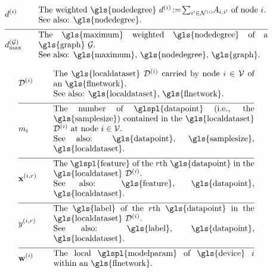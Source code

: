 \begin{align}
	&\nodedegree{\nodeidx} & \quad & \parbox{.80\textwidth}{The weighted \gls{nodedegree} 
		$\nodedegree{\nodeidx}\!\defeq\!\sum_{\nodeidx' \in \neighbourhood{\nodeidx}}\hspace*{-1mm} \edgeweight_{\nodeidx,\nodeidx'}$ of node $\nodeidx$. 
		\\ See also: \gls{nodedegree}. }  \nonumber \\[2mm] \hline \nonumber\\[-5mm]
	&\maxnodedegree^{(\graph)} & \quad & \parbox{.80\textwidth}{The \gls{maximum} weighted \gls{nodedegree} of a \gls{graph} $\graph$.
		\\ See also: \gls{maximum}, \gls{nodedegree}, \gls{graph}. } \nonumber 
\end{align} 

\begin{align} 
	&\localdataset{\nodeidx} & \quad & \parbox{.70\textwidth}{The \gls{localdataset} $\localdataset{\nodeidx}$ carried by 
		node $\nodeidx\in \nodes$ of an \gls{flnetwork}.
		\\ See also: \gls{localdataset}, \gls{flnetwork}. } \nonumber \\[2mm] \hline \nonumber\\[-5mm] 
	&\localsamplesize{\nodeidx} & \quad & \parbox{.70\textwidth}{The number of \glspl{datapoint} (i.e., the \gls{samplesize}) contained in the 
		\gls{localdataset} $\localdataset{\nodeidx}$ at node $\nodeidx\in \nodes$.
		\\ See also: \gls{datapoint}, \gls{samplesize}, \gls{localdataset}. } \nonumber \\[2mm] \hline \nonumber\\[-5mm]
	&\featurevec^{(\nodeidx,\sampleidx)} & \quad & \parbox{.70\textwidth}{The \glspl{feature} of the $\sampleidx$th \gls{datapoint} in 
		the \gls{localdataset} $\localdataset{\nodeidx}$.
		\\ See also: \gls{feature}, \gls{datapoint}, \gls{localdataset}. } \nonumber \\[2mm] \hline \nonumber\\[-5mm]
	&\truelabel^{(\nodeidx,\sampleidx)} & \quad & \parbox{.70\textwidth}{The \gls{label} of the $\sampleidx$th \gls{datapoint} in 
		the \gls{localdataset} $\localdataset{\nodeidx}$.
		\\ See also: \gls{label}, \gls{datapoint}, \gls{localdataset}. } \nonumber \\[2mm] \hline \nonumber\\[-5mm]
	&\localparams{\nodeidx} & \quad & \parbox{.70\textwidth}{The local \glspl{modelparam} of \gls{device} $\nodeidx$ within an \gls{flnetwork}.
}
\end{align}
